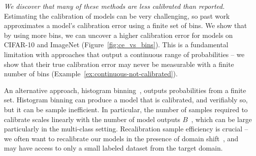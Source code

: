 

\emph{We discover that many of these methods are less calibrated than reported.} Estimating the calibration of models can be very challenging, so past work approximates a model's calibration error using a finite set of bins. We show that by using more bins, we can uncover a higher calibration error for models on CIFAR-10 and ImageNet (Figure~\ref{fig:ce_vs_bins}). This is a fundamental limitation with approaches that output a continuous range of probabilities -- we show that their true calibration error may never be measurable with a finite number of bins (Example~\ref{ex:continuous-not-calibrated}).

An alternative approach, histogram binning~\cite{zadrozny2001calibrated}, outputs probabilities from a finite set.
Histogram binning can produce a model that is calibrated, and verifiably so, but it can be sample inefficient.
In particular, the number of samples required to calibrate scales linearly with the number of model outputs $B$~\cite{naeini2014binary}, which can be large particularly in the multi-class setting.
Recalibration sample efficiency is crucial -- we often want to recalibrate our models in the presence of domain shift~\cite{hendrycks2019anomaly}, and may have access to only a small labeled dataset from the target domain.


